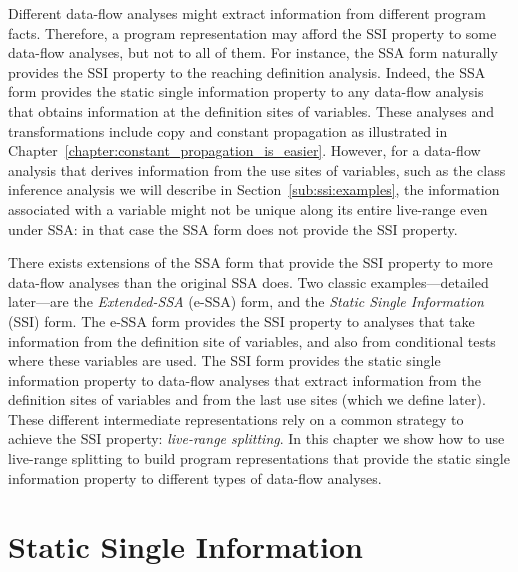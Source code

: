 {Different data-flow analyses might extract information from different program
facts.
Therefore, a program representation may afford the SSI property to some data-flow
analyses, but not to all of them.
For instance, the SSA form naturally provides the SSI property to the reaching
definition analysis.
Indeed, the SSA form provides the static single information property to any
data-flow analysis that obtains information at the definition sites of
variables.
These analyses and transformations include copy and constant propagation as illustrated in Chapter~\ref{chapter:constant_propagation_is_easier}.
However, for a data-flow analysis that derives information from the use sites 
of variables, such as the class inference analysis we will describe in 
Section~\ref{sub:ssi:examples}, the information associated with a variable 
might not be unique along its entire live-range even under SSA: in that case 
the SSA form does not provide the SSI property.

There exists extensions of the SSA form that provide the SSI property to more
data-flow analyses than the original SSA does.
Two classic examples---detailed later---are the {\em Extended-SSA} (e-SSA) 
form, and the {\em Static Single Information} (SSI) form.
The e-SSA form provides the SSI property to analyses that take information from
the definition site of variables, and also from conditional tests where these
variables are used.
The SSI form provides the static single information property to data-flow
analyses that extract information from the definition sites of variables and 
from the last use sites (which we define later).
These different intermediate representations rely on a common strategy to achieve the SSI property: {\em live-range splitting}.
In this chapter we show how to use live-range splitting to build program
representations that provide the static single information property to different
types of data-flow analyses.

\section{Static Single Information}
\label{sec:ssi:pereira:single}

}
